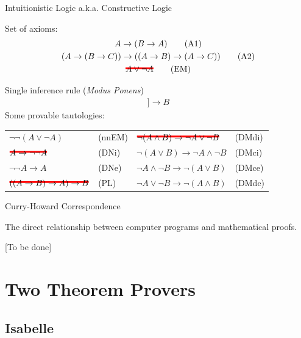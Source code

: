 \documentclass[aspectratio=169, fleqn]{beamer}
\newcommand\hcancel[2][black]{\setbox0=\hbox{$#2$}%
\rlap{\raisebox{.45\ht0}{\textcolor{#1}{\rule{\wd0}{2pt}}}}#2}
\begin{document}
\begin{frame}{Intuitionistic Logic}
{a.k.a. Constructive Logic}

\textcolor{dkblue}{Set of axioms:}
\begin{gather}
A \rightarrow (B \rightarrow A)
\tag{A1} \\
(A \rightarrow (B \rightarrow C)) \rightarrow ((A \rightarrow B) \rightarrow (A \rightarrow C))
\tag{A2} \\
\hcancel[red]{ A \lor \neg A }
\tag{EM} 
\end{gather}

\textcolor{dkblue}{Single inference rule (\textit{Modus Ponens})}
\begin{gather} 
[\![ A, A \rightarrow B ]\!] \longrightarrow B
\tag{MP}
\end{gather}
\textcolor{dkblue}{Some provable tautologies:}

\begin{tabular}{p{.32\linewidth}p{.2\linewidth} p{.3\linewidth}p{.25\linewidth}}
  $\neg \neg (A \lor \neg A)$ & (nnEM) & $\hcancel[red]{ \neg (A \land B) \rightarrow \neg A \lor \neg B }$ & (DMdi) \\
  $\hcancel[red]{ A \rightarrow \neg \neg A }$ & (DNi)  & $\neg (A \lor B) \rightarrow \neg A \land \neg B $ & (DMci) \\
  $\neg \neg A \rightarrow A$ & (DNe)  & $\neg A \land \neg B \rightarrow  \neg (A \lor B) $ & (DMce) \\
  $\hcancel[red]{ ((A \rightarrow B) \rightarrow A) \rightarrow B }$ & (PL) & $\neg A \lor \neg B \rightarrow  \neg (A \land B) $ & (DMde)
\end{tabular}

\end{frame}

\begin{frame}{Curry-Howard Correspondence}

The direct relationship between computer programs and mathematical proofs.

[To be done]
\end{frame}


\section{Two Theorem Provers}

\subsection{Isabelle}
\end{document}
